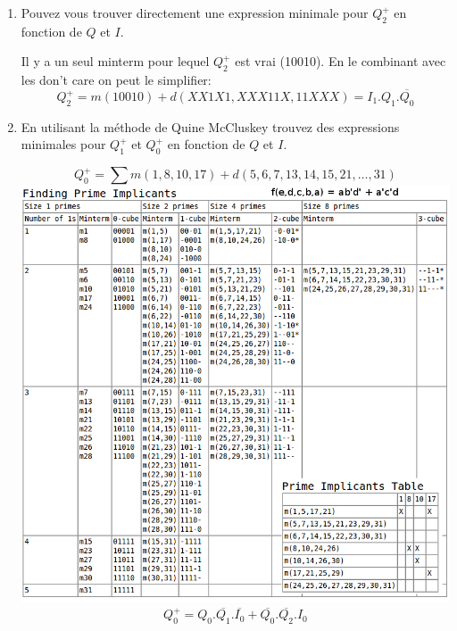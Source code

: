 \documentclass[a4paper,10pt]{exam}
\begin{document}
\begin{enumerate}
\begin{solution}
    \end{solution}
  \item Pouvez vous trouver directement une expression minimale pour $Q_2^{+}$
    en fonction de $Q$ et $I$.
      \begin{solution}
        Il y a un seul minterm pour lequel $Q_2^{+}$ est vrai (10010). En le
        combinant avec les don't care on peut le simplifier:
        $$Q_2^{+} = m(10010) + d(XX1X1, XXX11X, 11XXX) = I_1.Q_1.\overline{Q_0}$$
      \end{solution}

  \item En utilisant la méthode de Quine McCluskey trouvez des expressions
    minimales pour $Q_1^{+}$ et $Q_0^{+}$ en fonction de $Q$ et $I$.
    \begin{solution}
      $$Q_0^{+} = \sum m(1,8,10,17) + d(5,6,7,13,14,15,21,\dots,31)$$
      \includegraphics[width=.8\textwidth]{10MC2}
      $$Q_0^{+} = Q_0.\overline{Q_1}.\overline{I_0} +
      \overline{Q_0}.\overline{Q_2}.I_0$$


\end{solution}
\end{enumerate}
\end{document}
